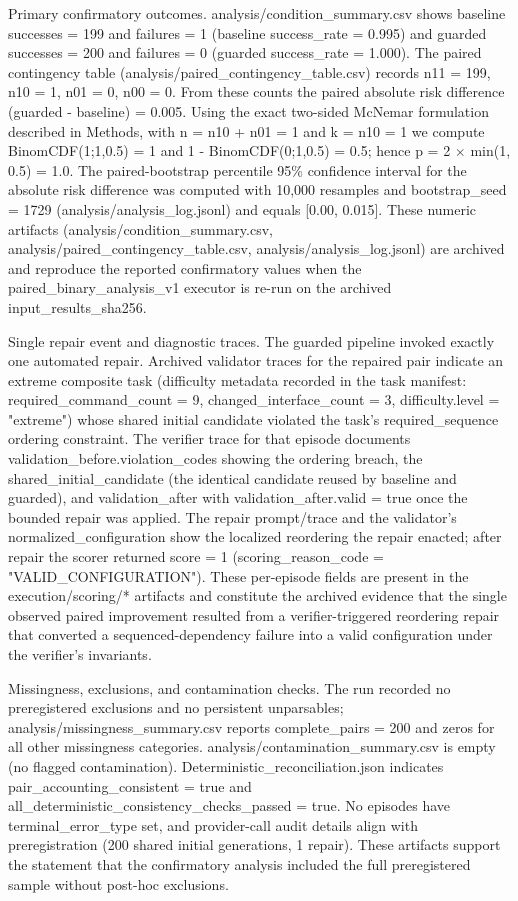 \documentclass[conference]{IEEEtran}
\begin{document}
Primary confirmatory outcomes. analysis/condition\_summary.csv shows baseline successes = 199 and failures = 1 (baseline success\_rate = 0.995) and guarded successes = 200 and failures = 0 (guarded success\_rate = 1.000). The paired contingency table (analysis/paired\_contingency\_table.csv) records n11 = 199, n10 = 1, n01 = 0, n00 = 0. From these counts the paired absolute risk difference (guarded - baseline) = 0.005. Using the exact two-sided McNemar formulation described in Methods, with n = n10 + n01 = 1 and k = n10 = 1 we compute BinomCDF(1;1,0.5) = 1 and 1 - BinomCDF(0;1,0.5) = 0.5; hence p = 2 \ensuremath{\times} min(1, 0.5) = 1.0. The paired-bootstrap percentile 95\% confidence interval for the absolute risk difference was computed with 10,000 resamples and bootstrap\_seed = 1729 (analysis/analysis\_log.jsonl) and equals [0.00, 0.015]. These numeric artifacts (analysis/condition\_summary.csv, analysis/paired\_contingency\_table.csv, analysis/analysis\_log.jsonl) are archived and reproduce the reported confirmatory values when the paired\_binary\_analysis\_v1 executor is re-run on the archived input\_results\_sha256.

Single repair event and diagnostic traces. The guarded pipeline invoked exactly one automated repair. Archived validator traces for the repaired pair indicate an extreme composite task (difficulty metadata recorded in the task manifest: required\_command\_count = 9, changed\_interface\_count = 3, difficulty.level = "extreme") whose shared initial candidate violated the task's required\_sequence ordering constraint. The verifier trace for that episode documents validation\_before.violation\_codes showing the ordering breach, the shared\_initial\_candidate (the identical candidate reused by baseline and guarded), and validation\_after with validation\_after.valid = true once the bounded repair was applied. The repair prompt/trace and the validator's normalized\_configuration show the localized reordering the repair enacted; after repair the scorer returned score = 1 (scoring\_reason\_code = "VALID\_CONFIGURATION"). These per-episode fields are present in the execution/scoring/* artifacts and constitute the archived evidence that the single observed paired improvement resulted from a verifier-triggered reordering repair that converted a sequenced-dependency failure into a valid configuration under the verifier's invariants.

Missingness, exclusions, and contamination checks. The run recorded no preregistered exclusions and no persistent unparsables; analysis/missingness\_summary.csv reports complete\_pairs = 200 and zeros for all other missingness categories. analysis/contamination\_summary.csv is empty (no flagged contamination). Deterministic\_reconciliation.json indicates pair\_accounting\_consistent = true and all\_deterministic\_consistency\_checks\_passed = true. No episodes have terminal\_error\_type set, and provider-call audit details align with preregistration (200 shared initial generations, 1 repair). These artifacts support the statement that the confirmatory analysis included the full preregistered sample without post-hoc exclusions.
\end{document}

